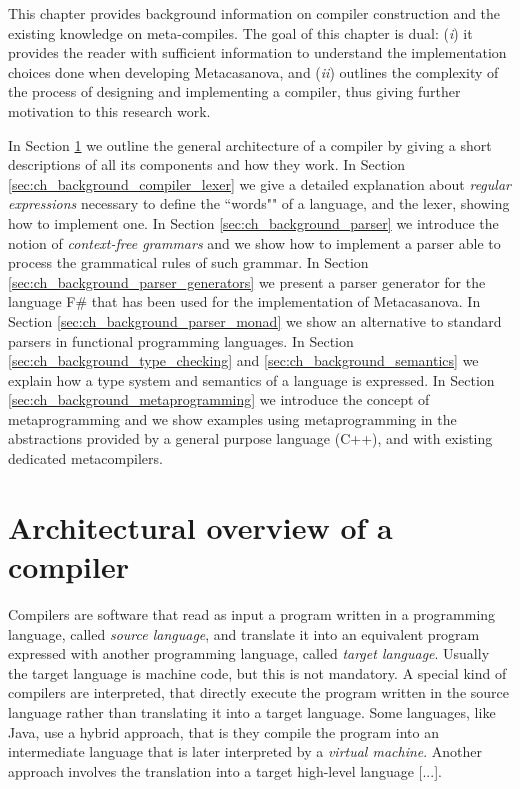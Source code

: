 This chapter provides background information on compiler construction and the existing knowledge on meta-compiles. The goal of this chapter is dual: (\textit{i}) it provides the reader with sufficient information to understand the implementation choices done when developing Metacasanova, and (\textit{ii}) outlines the complexity of the process of designing and implementing a compiler, thus giving further motivation to this research work.

In Section \ref{sec:ch_background_compiler_architecture} we outline the general architecture of a compiler by giving a short descriptions of all its components and how they work. In Section \ref{sec:ch_background_compiler_lexer} we give a detailed explanation about \textit{regular expressions} necessary to define the ``words"" of a language, and the lexer, showing how to implement one. In Section \ref{sec:ch_background_parser} we introduce the notion of \textit{context-free grammars} and we show how to implement a parser able to process the grammatical rules of such grammar. In Section \ref{sec:ch_background_parser_generators} we present a parser generator for the language F\# that has been used for the implementation of Metacasanova. In Section \ref{sec:ch_background_parser_monad} we show an alternative to standard parsers in functional programming languages. In Section \ref{sec:ch_background_type_checking} and \ref{sec:ch_background_semantics} we explain how a type system and semantics of a language is expressed. In Section \ref{sec:ch_background_metaprogramming} we introduce the concept of metaprogramming and we show examples using metaprogramming in the abstractions provided by a general purpose language (C++), and with existing dedicated metacompilers.

\section{Architectural overview of a compiler}
\label{sec:ch_background_compiler_architecture}
Compilers are software that read as input a program written in a programming language, called \textit{source language}, and translate it into an equivalent program expressed with another programming language, called \textit{target language}. Usually the target language is machine code, but this is not mandatory. A special kind of compilers are interpreted, that directly execute the program written in the source language rather than translating it into a target language. Some languages, like Java, use a hybrid approach, that is they compile the program into an intermediate language that is later interpreted by a \textit{virtual machine}. Another approach involves the translation into a target high-level language [...].


